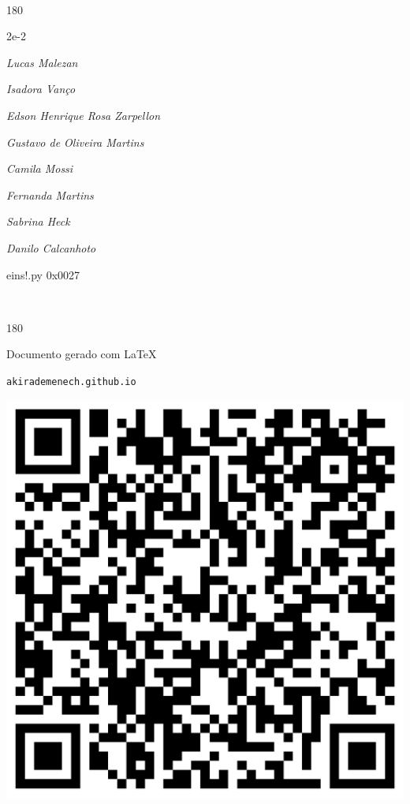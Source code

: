 \documentclass[12pt]{article}
\begin{document}
	\ 
	\vfill
	\begin{turn}{180}	
		\begin{minipage}{\textwidth}
		  	\ttfamily %
			\centering
			{\Huge 2e-2}
		  
			\hfill
		  
			

\textit{\small Lucas Malezan}

\textit{\small Isadora Vanço}

\textit{\small Edson Henrique Rosa Zarpellon}

\textit{\small Gustavo de Oliveira Martins}

\textit{\small Camila Mossi}

\textit{\small Fernanda Martins}

\textit{\small Sabrina Heck}

\textit{\small Danilo Calcanhoto}

\bigskip

eins!.py
0x0027


		\end{minipage}	
	\end{turn}
	\vfill
	\

\pagebreak

	\begin{turn}{180}	
		\begin{minipage}{\textwidth}		  
		  Documento gerado com \LaTeX			
		  
		  \texttt{akirademenech.github.io}

		  \includegraphics[height=0.3\textheight]{2e-2.pdf}

		\end{minipage}	
	\end{turn}  
		  
\end{document}

